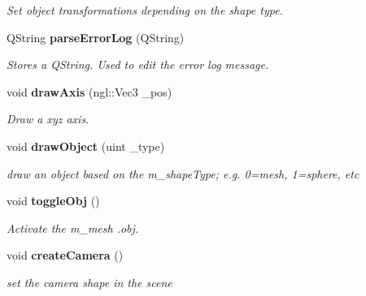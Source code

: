 \begin{DoxyCompactItemize}
\begin{DoxyCompactList}\small\item\em Set object transformations depending on the shape type. \end{DoxyCompactList}\item 
Q\-String {\bf parse\-Error\-Log} (Q\-String)
\begin{DoxyCompactList}\small\item\em Stores a Q\-String. Used to edit the error log message. \end{DoxyCompactList}\item 
void {\bf draw\-Axis} (ngl\-::\-Vec3 \-\_\-pos)
\begin{DoxyCompactList}\small\item\em Draw a xyz axis. \end{DoxyCompactList}\item 
void {\bf draw\-Object} (uint \-\_\-type)
\begin{DoxyCompactList}\small\item\em draw an object based on the m\-\_\-shape\-Type; e.\-g. 0=mesh, 1=sphere, etc \end{DoxyCompactList}\item 
void {\bf toggle\-Obj} ()
\begin{DoxyCompactList}\small\item\em Activate the m\-\_\-mesh .obj. \end{DoxyCompactList}\item 
void {\bf create\-Camera} ()
\begin{DoxyCompactList}\small\item\em set the camera shape in the scene \end{DoxyCompactList}\end{DoxyCompactItemize}
